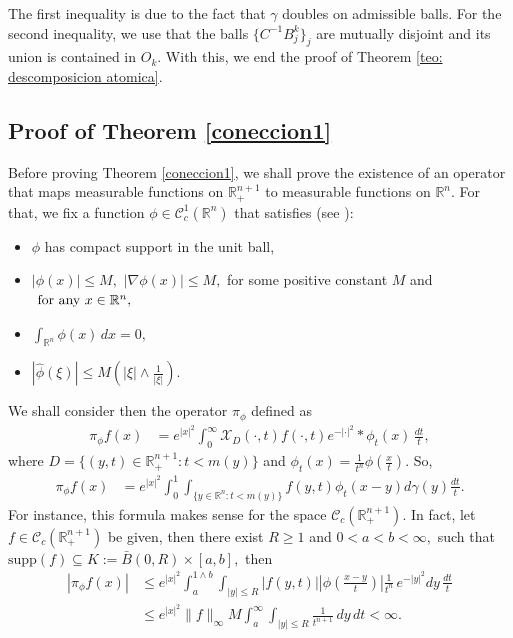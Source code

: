 \documentclass[leqno,11pt]{amsart}
\theoremstyle{plain}
\theoremstyle{remark}
\begin{document}
{{The first inequality is due to the fact that $\gamma$ doubles on admissible balls. For the second inequality, we use that the balls $\{C^{-1}B_j^k\}_j$ are mutually disjoint and its union is contained in $O_k.$ With this, we end the proof of Theorem \ref{teo: descomposicion atomica}.
 
\subsection{Proof of Theorem \ref{coneccion1} }\label{edison1}

Before proving Theorem \ref{coneccion1}, we shall prove the existence of
an 
operator that maps measurable functions on $\mathbb{R}^{n+1}_+$ to measurable functions on $\mathbb{R}^n.$
For that, 
we fix a function $\phi\in \mathscr{C}^1_c(\mathbb{R}^n)$ that satisfies (see \cite{cms}):
\begin{itemize}
\item $\phi$ has compact support in the unit ball,
\item $|\phi(x)|\le M,$ $|\nabla \phi (x)|\le M,$ for some positive constant $M$ and $\hbox{ for any } x\in{\mathbb R}^n,$ 
\item $\int_{{\mathbb R}^n}\phi(x)\, dx=0,$
\item $|\hat{\phi}(\xi)|\le M \left(|\xi|\wedge \frac{1}{|\xi|}\right).$
\end{itemize}
We shall consider then the operator $\pi_\phi$ defined as
\begin{align}\label{conexionH1}
\pi_\phi f(x) &= e^{|x|^2}\int_0^\infty \mathcal{X}_D(\cdot, t) f(\cdot, t)e^{-|\cdot|^2}\ast \phi_{t}(x)\, \frac{dt}{t},
\end{align}
where $D=\{(y,t)\in \mathbb{R}^{n+1}_+: t<m(y)\}$ and $\phi_t (x) = \frac{1}{t^n} \phi(\frac{x}{t}).$
So,\begin{align*} \pi_\phi f (x)
&= e^{|x|^2}\int_0^1 \int_{\{y\in \mathbb{R}^n: t<m(y)\}} f(y,t)\phi_t(x-y) d\gamma (y)\frac{dt}{t}.\nonumber
\end{align*} For instance, this formula makes sense for the space $\mathscr{C}_c({\mathbb R}^{n+1}_+).$ In fact, let $f\in \mathscr{C}_c({\mathbb R}^{n+1}_+)$ be given, then there exist $R\ge 1$ and $0<a<b<\infty,$ such that $\text{supp}(f)\subseteq K:=\bar{B}(0,R)\times [a,b],$ then
\begin{align*}
|\pi_\phi f (x)|&\le e^{|x|^2} \int_a^{1\wedge b}\int_{|y|\le R}|f(y,t)|\left|\phi\left(\frac{x-y}{t}\right)\right|\frac{1}{t^n}\, e^{-|y|^2} dy\, \frac{dt}{t} \\ &\le e^{|x|^2}\|f\|_\infty M \int_a^\infty \int_{|y|\le R}\frac{1}{t^{n+1}}\, dy \, dt<\infty.
\end{align*}
 

}}
\end{document}
